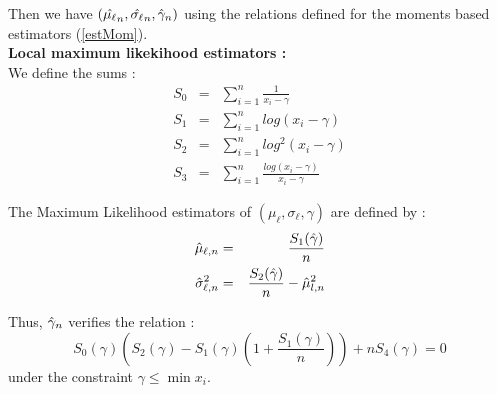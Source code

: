 Then we have $(\Hat{\mu_\ell}_n, \Hat{\sigma_\ell}_n, \Hat{\gamma}_n)$ using the relations defined for the moments based estimators (\ref{estMom}).\\

{\bf Local maximum likekihood estimators : }\\

We define the sums :
\begin{eqnarray}
\displaystyle S_0 & = & \sum_{i=1}^n \frac{1}{x_i - \gamma} \nonumber \\
\displaystyle S_1 & = & \sum_{i=1}^n log(x_i - \gamma)  \nonumber \\
\displaystyle S_2 &  = & \sum_{i=1}^n log^2(x_i - \gamma)  \nonumber \\
\displaystyle S_3 & = & \sum_{i=1}^n \frac{log(x_i - \gamma)}{x_i - \gamma} \nonumber
\end{eqnarray}

The Maximum Likelihood estimators of  $(\mu_\ell, \sigma_\ell, \gamma)$ are defined by :
\begin{eqnarray}
\displaystyle\Hat{\mu}_{\ell,n} & = & \frac{S_1(\Hat{\gamma})}{n}  \label{MLEMu3} \\
\displaystyle\Hat{\sigma}_{\ell,n}^2 & = & \frac{S_2(\Hat{\gamma})}{n} - \Hat{\mu}_{l,n}^2 \label{MLESigma3}
\end{eqnarray}

Thus, $\Hat{\gamma}_n$ verifies the relation :
\begin{equation} \label{relaGamma}
S_0(\gamma)\left(S_2(\gamma)-S_1(\gamma)\left(1+\frac{S_1(\gamma)}{n}\right)\right) + nS_4(\gamma) = 0
\end{equation}
under the constraint  $\gamma \leq \min x_i$.




